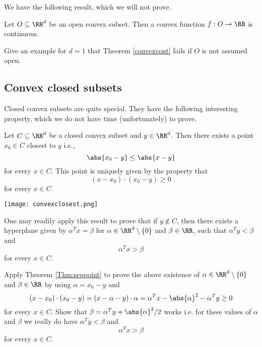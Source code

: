 \documentclass{article}
\begin{document}
  We have the following result, which we will not prove.

\begin{theorem}\label{convexcont}
  Let $O\subseteq \RR^d$ be an open convex subset. Then a convex function $f:O\rightarrow \RR$
  is continuous.
\end{theorem}

\beginshex
Give an example for $d=1$ that Theorem \ref{convexcont} fails if $O$ is not
assumed open.
\endshex



\subsection{Convex closed subsets}

Closed convex subsets are quite special. They have the following
interesting property, which we do not have time (unfortunately) to prove.

\begin{theorem}\label{Thm:seppoint}
  Let $C\subseteq \RR^d$ be a closed convex subset and $y\in \RR^d$. Then
  there exists a point $x_0\in C$ closest to $y$ i.e.,
  \begin{equation*}
    \abs{ x_0 - y } \leq \abs{ x - y }
  \end{equation*}
  for every $x\in C$. This point is uniquely given by the property
  that
  \begin{equation*}
    (x - x_0)\cdot (x_0 - y) \geq 0
  \end{equation*}
  for every $x\in C$.
\end{theorem}

\texttt{[image: convexclosest.png]}  

One may readily apply this result to prove that if $y\not\in C$, then there exists
a hyperplane given by $\alpha^T x = \beta$ for $\alpha\in\RR^d\setminus\{0\}$ and
$\beta\in \RR$, such that
$\alpha^T y < \beta$ and 
$$
\alpha^T x > \beta
$$
for every $x\in C$.

\beginshex
Apply Theorem \ref{Thm:seppoint} to prove the
above existence of $\alpha\in \RR^d\setminus\{0\}$ and $\beta\in \RR$ by
using $\alpha = x_0 - y$ and
$$
(x - x_0)\cdot (x_0 - y) = (x-\alpha -y)\cdot \alpha = \alpha^T x - \abs{\alpha}^2 -\alpha^T y\geq 0
$$
for every $x\in C$. Show that $\beta = \alpha^T y + \abs{\alpha}^2/2$ works i.e. for these
values of $\alpha$ and $\beta$ we really do have
$\alpha^T y < \beta$ and 
$$
\alpha^T x > \beta
$$
for every $x\in C$.
\endshex
\end{document}

